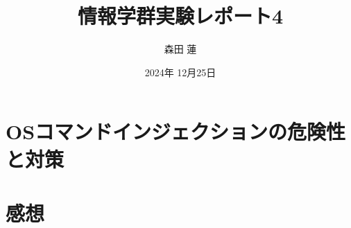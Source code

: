 \documentclass{jlreq}
\title{情報学群実験レポート4}
\author{森田 蓮}
\date{2024年 12月25日}
\begin{document}
\maketitle

\section{OSコマンドインジェクションの危険性と対策}




\section{感想}
\end{document}

